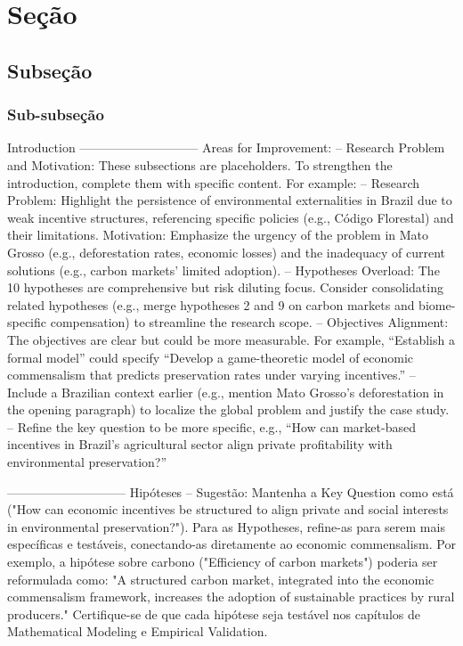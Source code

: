 
\section{Seção}

\subsection{Subseção}

\subsubsection{Sub-subseção}



Introduction
-----------------------------
Areas for Improvement:
-- Research Problem and Motivation: These subsections are placeholders. To strengthen the introduction, complete them with specific content. For example:
-- Research Problem: Highlight the persistence of environmental externalities in Brazil due to weak incentive structures, referencing specific policies (e.g., Código Florestal) and their limitations.
Motivation: Emphasize the urgency of the problem in Mato Grosso (e.g., deforestation rates, economic losses) and the inadequacy of current solutions (e.g., carbon markets’ limited adoption).
-- Hypotheses Overload: The 10 hypotheses are comprehensive but risk diluting focus. Consider consolidating related hypotheses (e.g., merge hypotheses 2 and 9 on carbon markets and biome-specific compensation) to streamline the research scope.
-- Objectives Alignment: The objectives are clear but could be more measurable. For example, “Establish a formal model” could specify “Develop a game-theoretic model of economic commensalism that predicts preservation rates under varying incentives.”
-- Include a Brazilian context earlier (e.g., mention Mato Grosso’s deforestation in the opening paragraph) to localize the global problem and justify the case study.
-- Refine the key question to be more specific, e.g., “How can market-based incentives in Brazil’s agricultural sector align private profitability with environmental preservation?”

-----------------------------
Hipóteses
-- Sugestão: Mantenha a Key Question como está ("How can economic incentives be structured to align private and social interests in environmental preservation?"). Para as Hypotheses, refine-as para serem mais específicas e testáveis, conectando-as diretamente ao economic commensalism. Por exemplo, a hipótese sobre carbono ("Efficiency of carbon markets") poderia ser reformulada como: "A structured carbon market, integrated into the economic commensalism framework, increases the adoption of sustainable practices by rural producers." Certifique-se de que cada hipótese seja testável nos capítulos de Mathematical Modeling e Empirical Validation.

